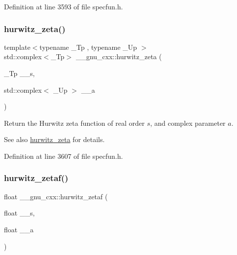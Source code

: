 Definition at line 3593 of file specfun.\+h.

\mbox{\label{group__gnu__math__spec__func_gaa7f0d1fbba9d2ce07a30d907302d527f}} 
\subsubsection{\texorpdfstring{hurwitz\+\_\+zeta()}{hurwitz\_zeta()}\hspace{0.1cm}{\footnotesize\ttfamily [2/2]}}
{\footnotesize\ttfamily template$<$typename \+\_\+\+Tp , typename \+\_\+\+Up $>$ \\
std\+::complex$<$\+\_\+\+Tp$>$ \+\_\+\+\_\+gnu\+\_\+cxx\+::hurwitz\+\_\+zeta (\begin{DoxyParamCaption}\item[{\+\_\+\+Tp}]{\+\_\+\+\_\+s,  }\item[{std\+::complex$<$ \+\_\+\+Up $>$}]{\+\_\+\+\_\+a }\end{DoxyParamCaption})}

Return the Hurwitz zeta function of real order $ s $, and complex parameter $ a $.

\begin{DoxySeeAlso}{See also}
\hyperlink{group__gnu__math__spec__func_ga7b167ce1c8d9aa6aad40fc83a95733bd}{hurwitz\+\_\+zeta} for details. 
\end{DoxySeeAlso}


Definition at line 3607 of file specfun.\+h.

\mbox{\label{group__gnu__math__spec__func_gaa745d7f2edde060ed2f22817ad89df1f}} 
\subsubsection{\texorpdfstring{hurwitz\+\_\+zetaf()}{hurwitz\_zetaf()}}
{\footnotesize\ttfamily float \+\_\+\+\_\+gnu\+\_\+cxx\+::hurwitz\+\_\+zetaf (\begin{DoxyParamCaption}\item[{float}]{\+\_\+\+\_\+s,  }\item[{float}]{\+\_\+\+\_\+a }\end{DoxyParamCaption})\hspace{0.3cm}{\ttfamily [inline]}}

